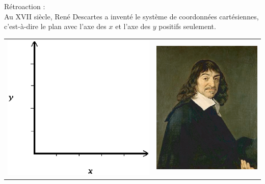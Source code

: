 \documentclass[letterpaper, 12pt]{article}
\begin{document}
R\'etroaction :\\
Au {\scriptsize XVII\ieme{}} si\`ecle, Ren\'e Descartes a invent\'e le syst\`eme de coordonn\'ees cart\'esiennes, c'est-\`a-dire le plan avec l'axe des $x$ et l'axe des $y$ positifs seulement.
\begin{center}
\begin{tabular}{c c}
\includegraphics[scale=0.4]{planDescartesien.eps} & \includegraphics[scale=0.4]{Descartes.eps}\\

\end{tabular}
\end{center}
\end{document}
